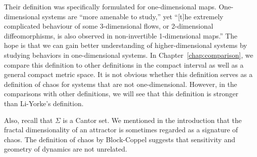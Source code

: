 \documentclass[10pt,twoside]{book}
\begin{document}
Their definition was specifically formulated for one-dimensional maps.
One-dimensional systems are ``more amenable to study,'' yet ``[t]he extremely complicated behaviour of some 3-dimensional flows, or 2-dimensional diffeomorphisms, is also observed in non-invertible 1-dimensional maps.''
The hope is that we can gain better understanding of higher-dimensional systems by studying behaviors in one-dimensional systems.
In Chapter~\ref{chap:comparison}, we compare this definition to other definitions in the compact interval as well as a general compact metric space.
It is not obvious whether this definition serves as a definition of chaos for systems that are not one-dimensional.
However, in the comparisons with other definitions, we will see that this definition is stronger than Li-Yorke's definition.

Also, recall that $\Sigma$ is a Cantor set.
We mentioned in the introduction that the fractal dimensionality of an attractor is sometimes regarded as a signature of chaos.
The definition of chaos by Block-Coppel suggests that sensitivity and geometry of dynamics are not unrelated.





\printindex
\end{document}
